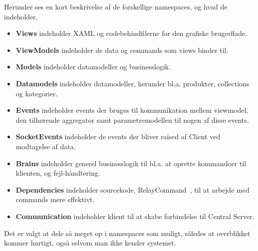 Herunder ses en kort beskrivelse af de forskellige namespaces, og hvad de indeholder.

\begin{itemize}
\item \textbf{Views} indeholder XAML og codebehindfilerne for den grafiske brugerflade. 
\item \textbf{ViewModels} indeholder de data og commands som views binder til. 
\item \textbf{Models} indeholder datamodeller og businesslogik.
\item \textbf{Datamodels} indeholder datamodeller, herunder bl.a. produkter, collections og kategorier.
\item \textbf{Events} indeholder events der bruges til kommunikation mellem viewmodel, den tilhørende aggregator samt parametremodellen til nogen af disse events.
\item \textbf{SocketEvents} indeholder de events der bliver raised af Client ved modtagelse af data.
\item \textbf{Brains} indeholder generel businesslogik til bl.a. at oprette kommandoer til klienten, og fejl-håndtering.
\item \textbf{Dependencies} indeholder sourcekode, RelayCommand~\cite{RelayC}, til at arbejde med commands mere effektivt.
\item \textbf{Communication} indeholder klient til at skabe forbindelse til Central Server.
\end{itemize}

Det er valgt at dele så meget op i namespaces som muligt, således at overblikket kommer hurtigt, også selvom man ikke kender systemet. 
